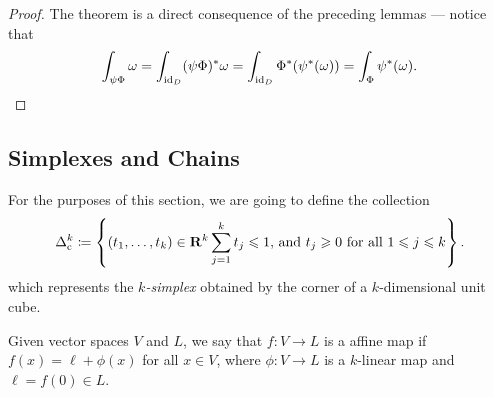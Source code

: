 \begin{proof}
The theorem is a direct consequence of the preceding lemmas --- notice that
\[
  \int_{\psi \Phi} \omega
  = \int_{\operatorname{id}_D} (\psi \Phi)^{*} \omega
  = \int_{\operatorname{id}_D} \Phi^{*}(\psi^{*}(\omega))
  = \int_{\Phi} \psi^{*}(\omega).
\]
\end{proof}

\subsection{Simplexes and Chains}

\begin{notation}
For the purposes of this section, we are going to define the collection
\[
  \Delta_{\text{c}}^k \coloneq \left\{
    (t_{1}, \dots, t_k) \in \mathbf{R}^k \relax
    \sum_{j=1}^k t_j \leqslant 1 \text{, and }
    t_j \geqslant 0 \text{ for all } 1 \leqslant j \leqslant k
  \right\}.
\]
which represents the \emph{\(k\)-simplex} obtained by the corner of a
\(k\)-dimensional unit cube.
\end{notation}

\begin{definition}
\label{def:affine-map}
Given vector spaces \(V\) and \(L\), we say that \(f: V \to L\) is a affine map
if \(f(x) = \ell + \phi(x)\) for all \(x \in V\), where \(\phi: V \to L\) is a
\(k\)-linear map and \(\ell = f(0) \in L\).
\end{definition}

